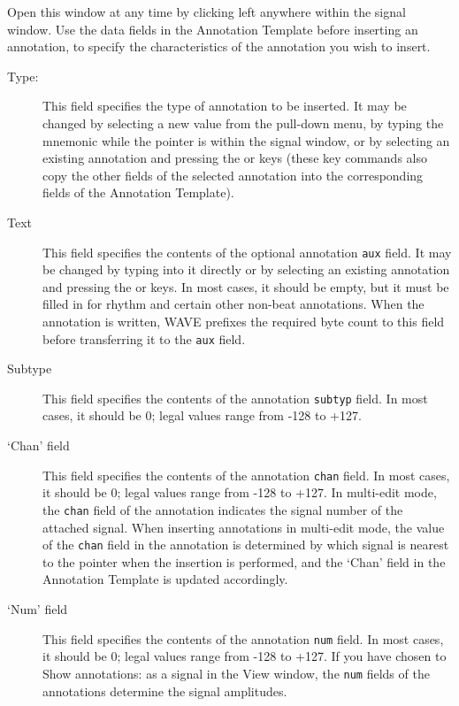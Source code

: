 \documentclass[twoside]{book}
\newcommand{\keycap}[1]{\cornersize{.5}\Ovalbox{\small\sf #1}}
\newcommand{\amenubutton}[1]{{\sf #1}~\keycap{\ensuremath{\nabla}}}
\newcommand{\WAVE}{{\sf WAVE}\xspace}
\begin{document}
\begin{figure}[h]
\centerline{}
\end{figure}
\label{sec:annotation-template-window}
Open this window at any time by clicking left anywhere within the
signal window.  Use the data fields in the {\sf Annotation Template}
before inserting an annotation, to specify the characteristics of the
annotation you wish to insert.

\begin{description}
\item[\amenubutton{Type:}]
This field specifies the type of annotation to be inserted.  It may be changed
by selecting a new value from the pull-down menu, by typing the mnemonic while
the pointer is within the signal window, or by selecting an existing annotation
and pressing the \keycap{Copy} or \keycap{F6} keys (these key commands also
copy the other fields of the selected annotation into the corresponding fields
of the {\sf Annotation Template}).

\item[{\sf Text}]
This field specifies the contents of the optional annotation {\tt aux} field.
It may be changed by typing into it directly or by selecting an existing
annotation and pressing the \keycap{Copy} or \keycap{F6} keys.  In most cases,
it should be empty, but it must be filled in for rhythm and certain other
non-beat annotations.  When the annotation is written, \WAVE{} prefixes the
required byte count to this field before transferring it to the {\tt aux}
field.

\item[{\sf Subtype}]
This field specifies the contents of the annotation {\tt subtyp} field.  In
most cases, it should be 0; legal values range from -128 to +127.

\item[{\sf `Chan' field}]
This field specifies the contents of the annotation {\tt chan} field.  In most
cases, it should be 0; legal values range from -128 to +127.  In multi-edit
mode, the {\tt chan} field of the annotation indicates the signal number of
the attached signal.  When inserting annotations in multi-edit mode, the value
of the {\tt chan} field in the annotation is determined by which signal is
nearest to the pointer when the insertion is performed, and the {\sf `Chan'
field} in the {\sf Annotation Template} is updated accordingly.

\item[{\sf `Num' field}]
This field specifies the contents of the annotation {\tt num} field.  In most
cases, it should be 0; legal values range from -128 to +127.  If you
have chosen to {\sf Show annotations: as a signal} in the {\sf View} window,
the {\tt num} fields of the annotations determine the signal amplitudes.


\end{description}
\end{document}
